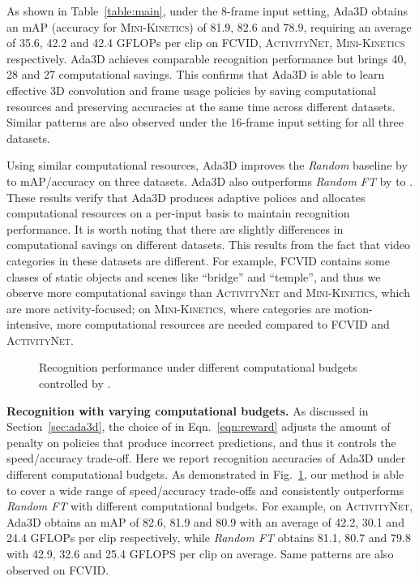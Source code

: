 \documentclass[final]{cvpr}
\newcommand{\anet}{{\scshape ActivityNet}\xspace}
\newcommand{\fcvid}{{\scshape FCVID}\xspace}
\newcommand{\minik}{{\scshape Mini-Kinetics}\xspace}
\newcommand{\system}{{Ada3D}\xspace}
\begin{document}
As shown in Table~\ref{table:main}, under the 8-frame input setting, \system obtains an mAP (accuracy for \minik) of 81.9, 82.6 and 78.9, requiring an average of 35.6, 42.2 and 42.4 GFLOPs per clip on \fcvid, \anet, \minik respectively. 
\system achieves comparable recognition performance but brings 40, 28 and 27 computational savings. This confirms that \system is able to learn effective 3D convolution and frame usage policies by saving computational resources and preserving accuracies at the same time across different datasets. Similar patterns are also observed under the 16-frame input setting for all three datasets.

Using similar computational resources, \system improves the \emph{Random} baseline by  to  mAP/accuracy on three datasets. \system also outperforms \emph{Random FT} by  to . These results verify that \system produces adaptive polices and allocates computational resources on a per-input basis to maintain recognition performance. It is worth noting that there are slightly differences in computational savings on different datasets. This results from the fact that video categories in these datasets are different. For example, FCVID contains some classes of static objects and scenes like ``bridge'' and ``temple'', and thus we observe more computational savings than \anet and \minik, which are more activity-focused; on \minik, where categories are motion-intensive, more computational resources are needed compared to \fcvid and \anet.

\begin{figure}[!b] \centering
   \vspace{-0.12in}
   \caption{Recognition performance under different computational budgets controlled by .}
   \label{fig:ablation}
\end{figure}

\vspace{0.05in}
\noindent\textbf{Recognition with varying computational budgets.} As discussed in Section~\ref{sec:ada3d}, the choice of  in Eqn.~\ref{eqn:reward} adjusts the amount of penalty on policies that produce incorrect predictions, and thus it controls the speed/accuracy trade-off. Here we report recognition accuracies of \system under different computational budgets. As demonstrated in Fig.~\ref{fig:ablation}, our method is able to cover a wide range of speed/accuracy trade-offs and consistently outperforms \emph{Random FT} with different computational budgets. For example, on \anet, \system obtains an mAP of 82.6, 81.9 and 80.9 with an average of 42.2, 30.1 and 24.4 GFLOPs per clip respectively, while \emph{Random FT} obtains 81.1, 80.7 and 79.8 with 42.9, 32.6 and 25.4 GFLOPS per clip on average. Same patterns are also observed on \fcvid. 
\end{document}
